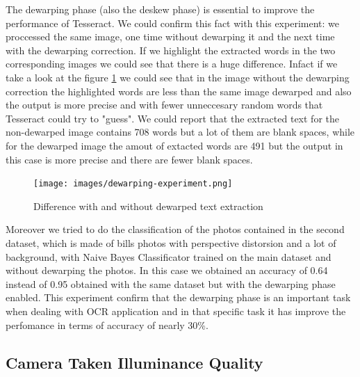 \documentclass[10pt,twocolumn,letterpaper]{article}
\begin{document}
The dewarping phase (also the deskew phase) is essential to improve the
performance of Tesseract. We could confirm this fact with this
experiment: we proccessed the same image, one time without dewarping
it and the next time with the dewarping correction. If we highlight
the extracted words in the two corresponding images we could see that
there is a huge difference. Infact if we take a look at the figure
\ref{dewarping-experiment} we could see that in the image without the
dewarping correction the highlighted words are less than the same image
dewarped and also the output is more precise and with fewer
unneccesary random words that Tesseract could try to "guess". We could
report that the extracted text for the non-dewarped image contains 708
words but a lot of them are blank spaces, while for the dewarped image
the amout of extacted words are 491 but the output in this case is
more precise and there are fewer blank spaces.

\begin{figure}[b]
  \centering
  \texttt{[image: images/dewarping-experiment.png]}
  \caption{Difference with and without dewarped text extraction}
  \label{dewarping-experiment}
\end{figure}

Moreover we tried to do the classification of the photos contained in
the second dataset, which is made of bills photos with perspective
distorsion and a lot of background, with Naive Bayes Classificator
trained on the main dataset and without dewarping the photos. In this
case we obtained an accuracy of 0.64 instead of 0.95 obtained with the
same dataset but with the dewarping phase enabled. This experiment confirm that the dewarping phase is an important
task when dealing with OCR application and in that specific task it
has improve the perfomance in terms of accuracy of nearly 30\%.

\subsection{Camera Taken Illuminance Quality}
\end{document}
